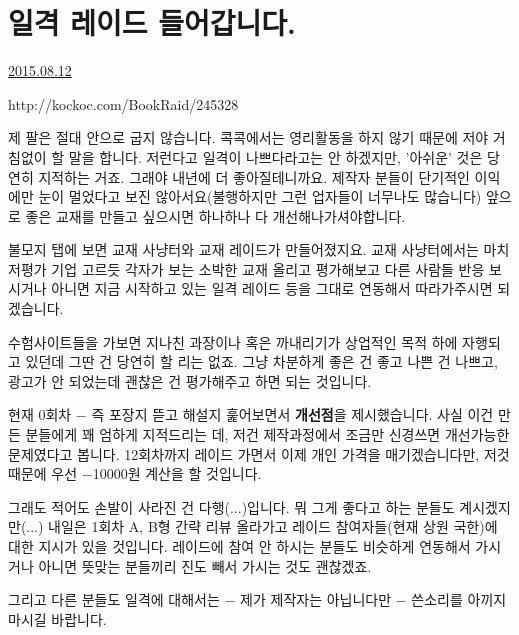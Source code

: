 
\section{일격 레이드 들어갑니다.}
\href{https://www.kockoc.com/Apoc/246737}{2015.08.12}

\vspace{5mm}

http://kockoc.com/BookRaid/245328
\vspace{5mm}

제 팔은 절대 안으로 굽지 않습니다.
콕콕에서는 영리활동을 하지 않기 때문에 저야 거침없이 할 말을 합니다.
저런다고 일격이 나쁘다라고는 안 하겠지만, '아쉬운' 것은 당연히 지적하는 거죠. 그래야 내년에 더 좋아질테니까요.
제작자 분들이 단기적인 이익에만 눈이 멀었다고 보진 않아서요(불행하지만 그런 업자들이 너무나도 많습니다)
앞으로 좋은 교재를 만들고 싶으시면 하나하나 다 개선해나가셔야합니다.
\vspace{5mm}

불모지 탭에 보면 교재 사냥터와 교재 레이드가 만들어졌지요.
교재 사냥터에서는 마치 저평가 기업 고르듯 각자가 보는 소박한 교재 올리고 평가해보고 다른 사람들 반응 보시거나
아니면 지금 시작하고 있는 일격 레이드 등을 그대로 연동해서 따라가주시면 되겠습니다.
\vspace{5mm}

수험사이트들을 가보면 지나친 과장이나 혹은 까내리기가 상업적인 목적 하에 자행되고 있던데 그딴 건 당연히 할 리는 없죠.
그냥 차분하게 좋은 건 좋고 나쁜 건 나쁘고, 광고가 안 되었는데 괜찮은 건 평가해주고 하면 되는 것입니다.
\vspace{5mm}

현재 0회차 $-$ 즉 포장지 뜯고 해설지 훑어보면서 \textbf{개선점}을 제시했습니다.
사실 이건 만든 분들에게 꽤 엄하게 지적드리는 데, 저건 제작과정에서 조금만 신경쓰면 개선가능한 문제였다고 봅니다.
12회차까지 레이드 가면서 이제 개인 가격을 매기겠습니다만, 저것 때문에 우선 $-$10000원 계산을 할 것입니다.
\vspace{5mm}

그래도 적어도 손발이 사라진 건 다행(...)입니다. 뭐 그게 좋다고 하는 분들도 계시겠지만(...)
내일은 1회차 A, B형 간략 리뷰 올라가고 레이드 참여자들(현재 상원 국한)에 대한 지시가 있을 것입니다.
레이드에 참여 안 하시는 분들도 비슷하게 연동해서 가시거나 아니면 뜻맞는 분들끼리 진도 빼서 가시는 것도 괜찮겠죠.
\vspace{5mm}

그리고 다른 분들도 일격에 대해서는 $-$ 제가 제작자는 아닙니다만 $-$ 쓴소리를 아끼지 마시길 바랍니다.
\vspace{5mm}

